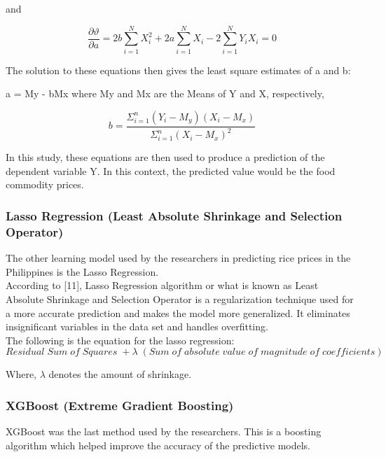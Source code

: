 \documentclass[runningheads]{llncs}
\begin{document}
\centerline{and}

\begin{equation}
	\frac{\partial\vartheta}{\partial a} = 2b \sum_{i=1}^{N} X_i^2 + 2a \sum_{i=1}^{N} X_i - 2\sum_{i=1}^{N} Y_i X_i = 0
\end{equation}

The solution to these equations then gives the least square estimates of a and b:

a = My - bMx where My and Mx are the Means of Y and X, respectively,


\begin{equation}
	b = \frac{\Sigma_{i=1}^n (Y_i - M_y)(X_i - M_x)}{\Sigma_{i=1}^n (X_i - M_x)^2}
\end{equation}


In this study, these equations are then used to produce a prediction of the dependent variable Y. In this context, the predicted value would be the food commodity prices. 

\subsubsection{Lasso Regression (Least Absolute Shrinkage and Selection Operator)}

The other learning model used by the researchers in predicting rice prices in the Philippines is the Lasso Regression.\\

According to [11], Lasso Regression algorithm or what is known as Least Absolute Shrinkage and Selection Operator is a regularization technique used for a more accurate prediction and makes the model more generalized. It eliminates insignificant variables in the data set and handles overfitting. \\

The following is the equation for the lasso regression:\\

\begin{equation}
Residual \;Sum \;of \;Squares \;+ \lambda \;(Sum \;of\;absolute \;value \;of \;magnitude \;of \;coefficients) 
\end{equation}

Where, $\lambda$ denotes the amount of shrinkage.

\subsubsection{XGBoost (Extreme Gradient Boosting)}
XGBoost was the last method used by the researchers. This is a boosting algorithm which helped improve the accuracy of the predictive models.
\end{document}
